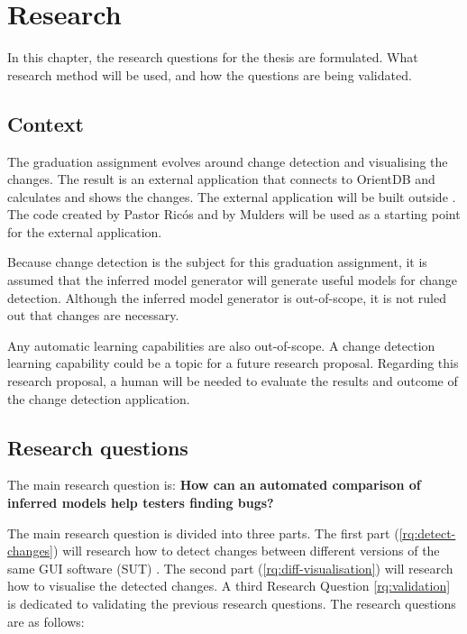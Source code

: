 \chapter{Research} \label{questions}
In this chapter, the research questions for the thesis are formulated. What research method will be used, and how the questions are being validated.

\section{Context}
The graduation assignment evolves around change detection and visualising the changes. The result is an external application that connects to OrientDB and calculates and shows the changes. The external application will be built outside \testar. The code created by Pastor Ricós and by Mulders will be used as a starting point for the external application. 

Because change detection is the subject for this graduation assignment, it is assumed that the inferred model generator will generate useful models for change detection. Although the inferred model generator is out-of-scope, it is not ruled out that changes are necessary.

Any automatic learning capabilities are also out-of-scope. A change detection learning capability could be a topic for a future research proposal. Regarding this research proposal, a human will be needed to evaluate the results and outcome of the change detection application.

\section{Research questions} \label{research-questions}
        
The main research question is: \textbf{How can an automated comparison of inferred models help testers finding bugs?}

The main research question is divided into three parts. The first part (\ref{rq:detect-changes}) will research how to detect changes between different versions of the same GUI software (SUT) \cite{testar-todo}. The second part (\ref{rq:diff-visualisation}) will research how to visualise the detected changes. A third Research Question \ref{rq:validation} is dedicated to validating the previous research questions. The research questions are as follows: 

